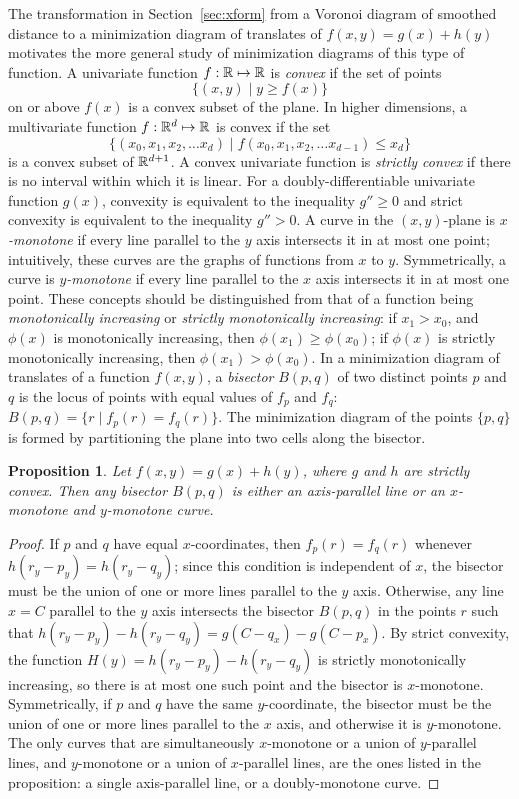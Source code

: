 \documentclass[10pt, conference, compsocconf]{IEEEtran}
\def\Real{\ensuremath{\Bbb R}}
\newtheorem{proposition}[theorem]{Proposition}
\begin{document}
The transformation in Section~\ref{sec:xform} from a Voronoi diagram of smoothed distance to a minimization diagram of translates of $f(x,y)=g(x)+h(y)$ motivates the more general study of minimization diagrams of this type of function.
A univariate function $f : \Real\mapsto\Real$ is \emph{convex} if the set of points 
\[ \{ (x, y) \mid y \geq f(x) \} \]
on or above $f(x)$ is a convex subset of the plane.  In higher dimensions, a multivariate function $f:\Real^d\mapsto\Real$ is convex if the set
$$\bigl\{(x_0,x_1,x_2,\dots x_d)\mid f(x_0,x_1,x_2,\dots x_{d-1})\le x_d\bigr\}$$
is a convex subset of $\Real^{d+1}$. 
A convex univariate function is \emph{strictly convex} if there is no interval within which it is linear. For a doubly-differentiable univariate function $g(x)$, convexity is equivalent to the inequality $g''\ge 0$ and strict convexity is equivalent to the inequality $g''>0$. A curve in the $(x,y)$-plane is \emph{$x$-monotone} if every line parallel to the $y$ axis intersects it in at most one point; intuitively, these curves are the graphs of functions from $x$ to $y$. Symmetrically, a curve is \emph{$y$-monotone} if every line parallel to the $x$ axis intersects it in at most one point. These concepts should be distinguished from that of a function being \emph{monotonically increasing} or \emph{strictly monotonically increasing}: if $x_1>x_0$, and $\phi(x)$ is monotonically increasing, then $\phi(x_1) \ge \phi(x_0)$; if  $\phi(x)$ is strictly monotonically increasing, then $\phi(x_1) > \phi(x_0)$. In a minimization diagram of translates of a function $f(x,y)$, a \emph{bisector} $B(p,q)$ of two distinct points $p$ and $q$ is the locus of points with equal values of $f_p$ and $f_q$: $B(p,q)=\{r\mid f_p(r)=f_q(r)\}$. The minimization diagram of the points $\{p,q\}$ is formed by partitioning the plane into two cells along the bisector.

\begin{proposition}
\label{prop:monotone-bisectors}
Let $f(x,y)=g(x)+h(y)$, where $g$ and $h$ are strictly convex. Then any bisector $B(p,q)$ is either an axis-parallel line or an $x$-monotone and $y$-monotone curve.
\end{proposition}

\begin{proof}
If $p$ and $q$ have equal $x$-coordinates, then $f_p(r)=f_q(r)$ whenever $h(r_y-p_y)=h(r_y-q_y)$; since this condition is independent of $x$, the bisector must be the union of one or more lines parallel to the $y$ axis. Otherwise, any line $x=C$ parallel to the $y$ axis intersects the bisector $B(p,q)$ in the points $r$ such that $h(r_y-p_y)-h(r_y-q_y)=g(C-q_x)-g(C-p_x)$. By strict convexity, the function $H(y)=h(r_y-p_y)-h(r_y-q_y)$ is strictly monotonically increasing, so there is at most one such point and the bisector is $x$-monotone.
Symmetrically, if $p$ and $q$ have the same $y$-coordinate, the bisector must be the union of one or more lines parallel to the $x$ axis, and otherwise it is $y$-monotone. The only curves that are simultaneously $x$-monotone or a union of $y$-parallel lines, and $y$-monotone or a union of $x$-parallel lines, are the ones listed in the proposition: a single axis-parallel line, or a doubly-monotone curve.
\end{proof}
\end{document}
